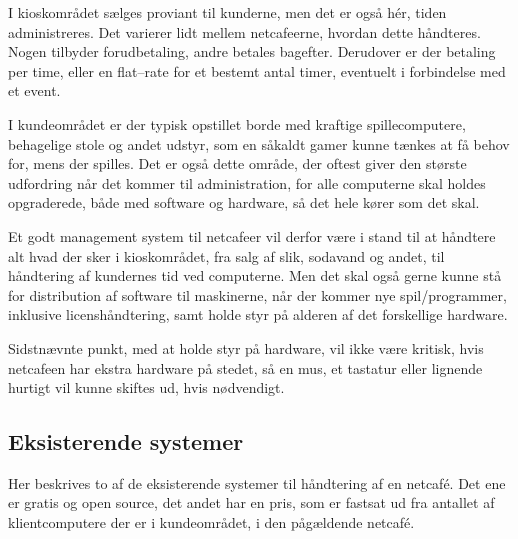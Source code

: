 I kioskområdet sælges proviant til kunderne, men det er også hér, tiden administreres. Det varierer lidt
mellem netcafeerne, hvordan dette håndteres. Nogen tilbyder forudbetaling, andre betales bagefter. Derudover
er der betaling per time, eller en flat--rate for et bestemt antal timer, eventuelt i forbindelse med et
event.

I kundeområdet er der typisk opstillet borde med kraftige spillecomputere, behagelige stole og andet udstyr,
som en såkaldt gamer kunne tænkes at få behov for, mens der spilles. Det er også dette område, der oftest
giver den største udfordring når det kommer til administration, for alle computerne skal holdes opgraderede,
både med software og hardware, så det hele kører som det skal.

Et godt management system til netcafeer vil derfor være i stand til at håndtere alt hvad der sker i
kioskområdet, fra salg af slik, sodavand og andet, til håndtering af kundernes tid ved computerne. Men det
skal også gerne kunne stå for distribution af software til maskinerne, når der kommer nye spil/programmer,
inklusive licenshåndtering, samt holde styr på alderen af det forskellige hardware.

Sidstnævnte punkt, med at holde styr på hardware, vil ikke være kritisk, hvis netcafeen har ekstra hardware på
stedet, så en mus, et tastatur eller lignende hurtigt vil kunne skiftes ud, hvis nødvendigt.


\subsection{Eksisterende systemer}\label{sec:eksisterende-systemer}

Her beskrives to af de eksisterende systemer til håndtering af en netcafé. Det ene er gratis og open source, det andet har en pris, som er fastsat ud fra antallet af klientcomputere der er i kundeområdet, i den pågældende netcafé.


\cbend